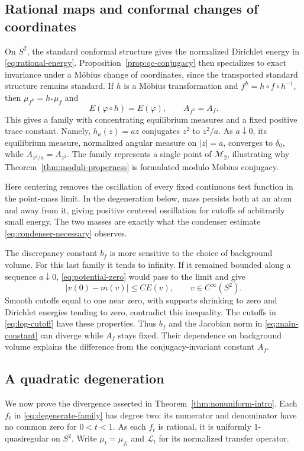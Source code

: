 \documentclass[11pt,reqno]{amsart}
\theoremstyle{plain}
\theoremstyle{definition}
\theoremstyle{remark}
\newcommand{\Lop}{\mathcal L}
\numberwithin{equation}{section}
\begin{document}
\subsection{Rational maps and conformal changes of coordinates}\label{subsec:rational-conjugates}

On $S^2$, the standard conformal structure gives the normalized Dirichlet energy in \eqref{eq:rational-energy}. Proposition~\ref{prop:qc-conjugacy} then specializes to exact invariance under a M\"obius change of coordinates, since the transported standard structure remains standard. If $h$ is a M\"obius transformation and $f^h=h\circ f\circ h^{-1}$, then $\mu_{f^h}=h_*\mu_f$ and
\[
 E(\varphi\circ h)=E(\varphi),\qquad A_{f^h}=A_f.
\]
This gives a family with concentrating equilibrium measures and a fixed positive trace constant. Namely, $h_a(z)=az$ conjugates $z^2$ to $z^2/a$. As $a\downarrow0$, its equilibrium measure, normalized angular measure on $|z|=a$, converges to $\delta_0$, while $A_{z^2/a}=A_{z^2}$. The family represents a single point of $\mathcal M_2$, illustrating why Theorem~\ref{thm:moduli-properness} is formulated modulo M\"obius conjugacy.

Here centering removes the oscillation of every fixed continuous test function in the point-mass limit. In the degeneration below, mass persists both at an atom and away from it, giving positive centered oscillation for cutoffs of arbitrarily small energy. The two masses are exactly what the condenser estimate \eqref{eq:condenser-necessary} observes.

The discrepancy constant $b_f$ is more sensitive to the choice of background volume. For this last family it tends to infinity. If it remained bounded along a sequence $a\downarrow0$, \eqref{eq:potential-zero} would pass to the limit and give
\[
 |v(0)-m(v)|\le C E(v),\qquad v\in C^\infty(S^2).
\]
Smooth cutoffs equal to one near zero, with supports shrinking to zero and Dirichlet energies tending to zero, contradict this inequality. The cutoffs in \eqref{eq:log-cutoff} have these properties. Thus $b_f$ and the Jacobian norm in \eqref{eq:main-constant} can diverge while $A_f$ stays fixed. Their dependence on background volume explains the difference from the conjugacy-invariant constant $A_f$.

\subsection{A quadratic degeneration}

We now prove the divergence asserted in Theorem~\ref{thm:nonuniform-intro}. Each $f_t$ in \eqref{eq:degenerate-family} has degree two: its numerator and denominator have no common zero for $0<t<1$. As each $f_t$ is rational, it is uniformly $1$-quasiregular on $S^2$. Write $\mu_t=\mu_{f_t}$ and $\Lop_t$ for its normalized transfer operator.
\end{document}
